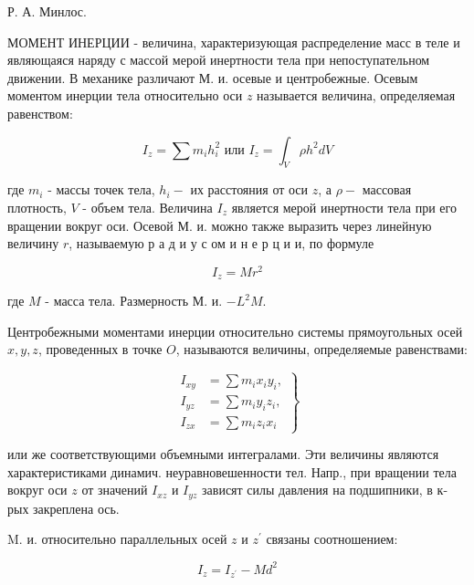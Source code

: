 \documentclass[10pt]{article}
\begin{document}
Р. А. Минлос.



МОМЕНТ ИНЕРЦИИ - величина, характеризующая распределение масс в теле и являющаяся наряду с массой мерой инертности тела при непоступательном движении. В механике различают М. и. осевые и центробежные. Осевым моментом инерции тела относительно оси $z$ называется величина, определяемая равенством:



\[

I_{z}=\sum m_{i} h_{i}^{2} \text { или } I_{z}=\int_{V} \rho h^{2} d V

\]



где $m_{i}$ - массы точек тела, $h_{i}-$ их расстояния от оси $z$, а $\rho-$ массовая плотность, $V$ - объем тела. Величина $I_{z}$ является мерой инертности тела при его вращении вокруг оси. Осевой М. и. можно также выразить через линейную величину $r$, называемую р а д и у с ом и н е р ц и и, по формуле



\[

I_{z}=M r^{2}

\]



где $M$ - масса тела. Размерность М. и. $-L^{2} M$.



Центробежными моментами инерции относительно системы прямоугольных осей $x, y, z$, проведенных в точке $O$, называются величины, определяемые равенствами:



\[

\left.\begin{array}{rl}

I_{x y} & =\sum m_{i} x_{i} y_{i}, \\

I_{y z} & =\sum m_{i} y_{i} z_{i}, \\

I_{z x} & =\sum m_{i} z_{i} x_{i}

\end{array}\right\}

\]



или же соответствующими объемными интегралами. Эти величины являются характеристиками динамич. неуравновешенности тел. Напр., при вращении тела вокруг оси $z$ от значений $I_{x z}$ и $I_{y z}$ зависят силы давления на подшипники, в к-рых закреплена ось.



M. и. относительно параллельных осей $z$ и $z^{\prime}$ связаны соотношением:



\[

I_{z}=I_{z^{\prime}}-M d^{2}

\]
\end{document}
